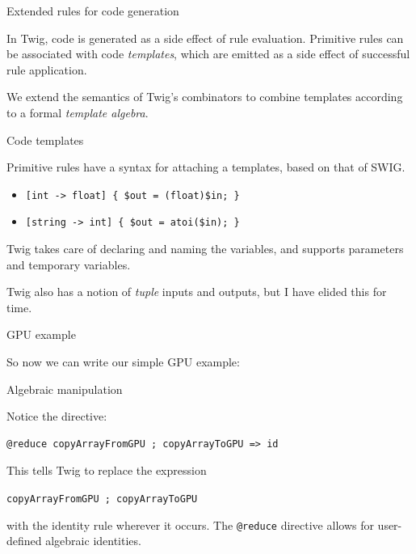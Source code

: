 \documentclass{beamer}
\begin{document}
\begin{frame}{Extended rules for code generation}

In Twig, code is generated as a side effect of rule evaluation. Primitive
rules can be associated with code \emph{templates}, which are emitted as a
side effect of successful rule application.

We extend the semantics of Twig's combinators to combine templates according
to a formal \emph{template algebra}.

\end{frame}


\begin{frame}{Code templates}

Primitive rules have a syntax for attaching a templates, based on that of
SWIG.

\begin{itemize}
  \item \texttt{[int -> float] \{ \$out = (float)\$in; \}}
  \item \texttt{[string -> int] \{ \$out = atoi(\$in); \}}
\end{itemize}  

Twig takes care of declaring and naming the variables, and supports parameters
and temporary variables.

Twig also has a notion of \emph{tuple} inputs and outputs, but I have elided
this for time.

\end{frame}


\begin{frame}[fragile]{GPU example}

So now we can write our simple GPU example:

\small

\normalsize

\end{frame}


\begin{frame}[fragile]{Algebraic manipulation}

Notice the \texttt{\@reduce} directive:

\begin{verbatim}
@reduce copyArrayFromGPU ; copyArrayToGPU => id
\end{verbatim}

This tells Twig to replace the expression

\texttt{copyArrayFromGPU ; copyArrayToGPU} 

with the identity rule wherever it occurs. The \texttt{@reduce} directive
allows for user-defined algebraic identities.

\end{frame}
\end{document}
